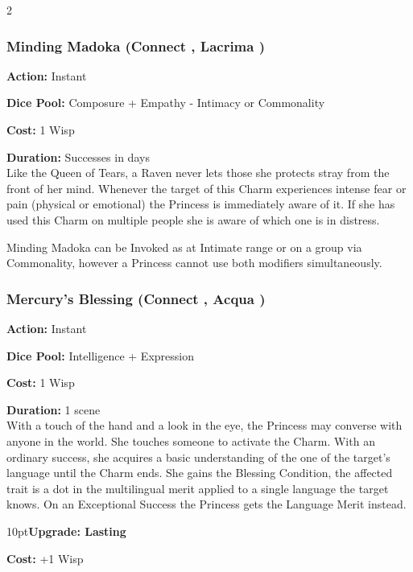 \begin{multicols}{2}
\subsubsection*{Minding Madoka (Connect \textbullet, Lacrima \textbullet\textbullet)}

\noindent \textbf{Action:} Instant

\noindent \textbf{Dice Pool:} Composure + Empathy - Intimacy or Commonality

\noindent \textbf{Cost:} 1 Wisp

\noindent \textbf{Duration:} Successes in days \\

Like the Queen of Tears, a Raven never lets those she protects stray from the front of her mind. Whenever the target of this Charm experiences intense fear or pain (physical or emotional) the Princess is immediately aware of it. If she has used this Charm on multiple people she is aware of which one is in distress. 

Minding Madoka can be Invoked as at Intimate range or on a group via Commonality, however a Princess cannot use both modifiers simultaneously.	

\subsubsection*{Mercury's Blessing (Connect \textbullet, Acqua \textbullet)}

\noindent \textbf{Action:} Instant

\noindent \textbf{Dice Pool:} Intelligence + Expression

\noindent \textbf{Cost:} 1 Wisp

\noindent \textbf{Duration:} 1 scene \\

\noindent With a touch of the hand and a look in the eye, the Princess may converse with anyone in the world. She touches someone to activate the Charm. With an ordinary success, she acquires a basic understanding of the one of the target's language until the Charm ends. She gains the Blessing Condition, the affected trait is a dot in the multilingual merit applied to a single language the target knows. On an Exceptional Success the Princess gets the Language Merit instead. 

\begin{myindentpar}{10pt}\textbf{Upgrade: Lasting}

\noindent \textbf{Cost:} +1 Wisp


\end{myindentpar}
\end{multicols}
